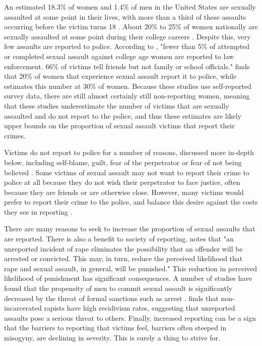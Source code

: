 \documentclass[AER,draftmode]{AEA}
\begin{document}
An estimated 18.3\% of women and 1.4\% of men in the United States are sexually assaulted at some point in their lives, with more than a third of these assaults occurring before the victim turns 18  \cite{black_national_2011}. About 20\% to 25\% of women nationally are sexually assaulted at some point during their college careers \cite{fisher_sexual_2000}. Despite this, very few assaults are reported to police. According to , "fewer than 5\% of attempted or completed sexual assault against college age women are reported to law enforcement. 66\% of victims tell friends but not family or school officials."  finds that 20\% of women that experience sexual assault report it to police, while  estimates this number at 30\% of women. Because these studies use self-reported survey data, there are still almost certainly still non-reporting women, meaning that these studies underestimate the number of victims that are sexually assaulted and do not report to the police, and thus these estimates are likely upper bounds on the proportion of sexual assault victims that report their crimes. 

Victims do not report to police for a number of reasons, discussed more in-depth below, including self-blame, guilt, fear of the perpetrator or fear of not being believed \cite{du_mont_role_2003}. Some victims of sexual assault may not want to report their crime to police at all because they do not wish their perpetrator to face justice, often because they are friends or are otherwise close. However, many victims would prefer to report their crime to the police, and balance this desire against the costs they see in reporting \cite{du_mont_role_2003}.

There are many reasons to seek to increase the proportion of sexual assaults that are reported. There is also a benefit to society of reporting.  notes that "an unreported incident of rape eliminates the possibility that an offender will be arrested or convicted. This may, in turn, reduce the perceived likelihood that rape and sexual assault, in general, will be punished." This reduction in perceived likelihood of punishment has significant consequences. A number of studies have found that the propensity of men to commit sexual assault is significantly decreased by the threat of formal sanctions such as arrest \cite{bachman_rationality_1992, antunes_impact_1974}.  finds that non-incarcerated rapists have high recidivism rates, suggesting that unreported assaults pose a serious threat to others. Finally, increased reporting can be a sign that the barriers to reporting that victims feel, barriers often steeped in misogyny, are declining in severity. This is surely a thing to strive for.
\end{document}
